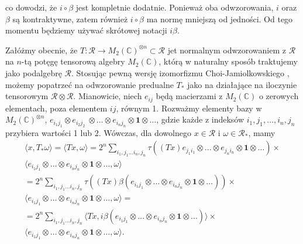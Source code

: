 co dowodzi, że $i \circ \beta$ jest kompletnie dodatnie.
Ponieważ oba odwzorowania, $i$ oraz $\beta$ są kontraktywne,
zatem również $i\circ\beta$ ma normę mniejszą od jedności.
Od tego momentu będziemy używać skrótowej notacji $i\beta$.

Załóżmy obecnie, że
$T: \mathcal{R} \rightarrow M_{2}(\mathbb{C})^{\otimes n}\subset \mathcal{R}$
jet normalnym odwzorowaniem z $\mathcal{R}$ na $n$-tą potęgę tensorową algebry 
$M_{2}(\mathbb{C})$, którą w naturalny sposób traktujemy jako podalgebrę $\mathcal{R}$.
Stosując pewną wersję izomorfizmu Choi-Jamiolkowskiego
\cite{choi1975completely,jamiolkowski1974effective},
możemy popatrzeć na odwzorowanie predualne $T_{*}$ jako na działające na 
iloczynie tensorowym $\mathcal{R}\otimes\mathcal{R}$.
Mianowicie, niech $e_{ij}$ będą macierzami z $M_{2}(\mathbb{C})$
o zerowych elementach, poza elementem $ij$, równym 1.
Rozważmy elementy bazy w
$M_{2}(\mathbb{C})^{\otimes n}$,
$e_{i_{1} j_{1}} \otimes e_{i_{2} j_{2}} \
\otimes \ldots \otimes e_{i_{n} j_{n}} \otimes \mathbf{1} \otimes \ldots$,
gdzie każde z indeksów $i_{1}, j_{1}, \ldots, i_{n}, j_{n}$
przybiera wartości 1 lub 2.
Wówczas, dla dowolnego $x \in \mathcal{R}$ i
$\omega \in \mathcal{R}_{*}$, mamy
\begin{eqnarray}
\langle x, T_{*} \omega \rangle =\langle T x,  \omega \rangle
=  2^{n} \sum \limits_{i_{1}, j_{1}\ldots i_{n}, j_{n}}
\tau \left((Tx) e_{j_{1} i_{1}} \otimes \ldots \otimes e_{j_{n} i_{n}}
\otimes \mathbf{1} \otimes \ldots \right) \times \nonumber\\
\langle e_{i_{1} j_{1}} \otimes \ldots \otimes e_{i_{n} j_{n}}
\otimes \mathbf{1} \otimes \ldots ,\omega \rangle\nonumber\\
= 2^{n} \sum \limits_{i_{1}, j_{1}\ldots i_{n}, j_{n}} \tau \left((Tx)
\beta (e_{i_{1} j_{1}} \otimes \ldots \otimes e_{i_{n} j_{n}}
\otimes \mathbf{1} \otimes \ldots ) \right) \times \nonumber\\
\langle e_{i_{1} j_{1}} \otimes \ldots \otimes e_{i_{n}j_{n}}
\otimes \mathbf{1} \otimes \ldots  , \omega \rangle = \nonumber\\
=  2^{n} \sum \limits_{i_{1}, j_{1}\ldots i_{n}, j_{n}}
\langle Tx ,i \beta (e_{i_{1} j_{1}} \otimes \ldots \otimes e_{i_{n} j_{n}}
\otimes \mathbf{1} \otimes \ldots) \rangle\times\nonumber\\
\langle e_{i_{1} j_{1}} \otimes \ldots \otimes e_{i_{n} j_{n}}
\otimes \mathbf{1} \otimes \ldots,\omega \rangle .
\end{eqnarray}

